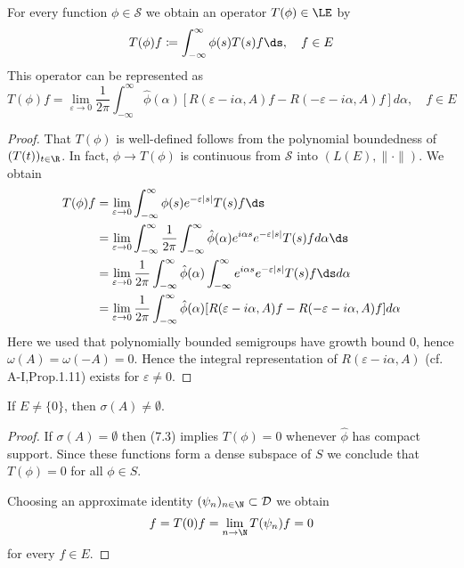 \begin{lemma}\label{lem:a3-7.5}
For every function $\phi \in \mathcal{S}$ we obtain an operator $T(\phi) \in \LE$ by
\[
T(\phi)f \coloneqq \int_{-\infty}^{\infty} \phi(s)T(s)f \ds, \quad f \in E
\]
This operator can be represented as
\begin{equation}\label{eq:a3-7.4}
T(\phi)f = \lim_{\varepsilon\to 0} \frac{1}{2\pi}\int_{-\infty}^{\infty} \hat{\phi}(\alpha)[R(\varepsilon-i\alpha,A)f - R(-\varepsilon-i\alpha,A)f] d\alpha, \quad f \in E
\end{equation}
\end{lemma}
\begin{proof}
That $T(\phi)$ is well-defined follows from the polynomial boundedness of $(T(t))_{t\in\R}$.
In fact, $\phi \to T(\phi)$ is continuous from $\mathcal{S}$ into $(L(E),\|\cdot\|)$.
We obtain
\begin{align*}
T(\phi)f &= \lim_{\varepsilon\to 0} \int_{-\infty}^{\infty} \phi(s)e^{-\varepsilon|s|}T(s)f \ds \\
&= \lim_{\varepsilon\to 0} \int_{-\infty}^{\infty} \frac{1}{2\pi}\int_{-\infty}^{\infty} \hat{\phi}(\alpha)e^{i\alpha s}e^{-\varepsilon|s|}T(s)f d\alpha \ds \\
&= \lim_{\varepsilon\to 0} \frac{1}{2\pi}\int_{-\infty}^{\infty} \hat{\phi}(\alpha)\int_{-\infty}^{\infty} e^{i\alpha s}e^{-\varepsilon|s|}T(s)f \ds d\alpha \\
&= \lim_{\varepsilon\to 0} \frac{1}{2\pi}\int_{-\infty}^{\infty} \hat{\phi}(\alpha)[R(\varepsilon-i\alpha,A)f - R(-\varepsilon-i\alpha,A)f] d\alpha
\end{align*}
Here we used that polynomially bounded semigroups have growth bound $0$, hence $\omega(A) = \omega(-A) = 0$.
Hence the integral representation of $R(\varepsilon-i\alpha,A)$ (cf. A-I,Prop.1.11) exists for $\varepsilon \neq 0$.
\end{proof}

\begin{lemma}\label{lem:a3-7.6}
If $E \neq \{0\}$, then $\sigma(A) \neq \emptyset$.
\end{lemma}

\begin{proof}
If $\sigma(A) = \emptyset$ then (7.3) implies $T(\phi) = 0$ whenever $\hat{\phi}$ has compact support.
Since these functions form a dense subspace of $S$ we conclude that $T(\phi) = 0$ for all $\phi \in S$.



Choosing an approximate identity $(\psi_{n})_{n\in\N} \subset \mathcal{D}$ we obtain
\[
f = T(0)f = \lim_{n\to\N} T(\psi_{n})f = 0
\]
for every $f \in E$.
\end{proof}



